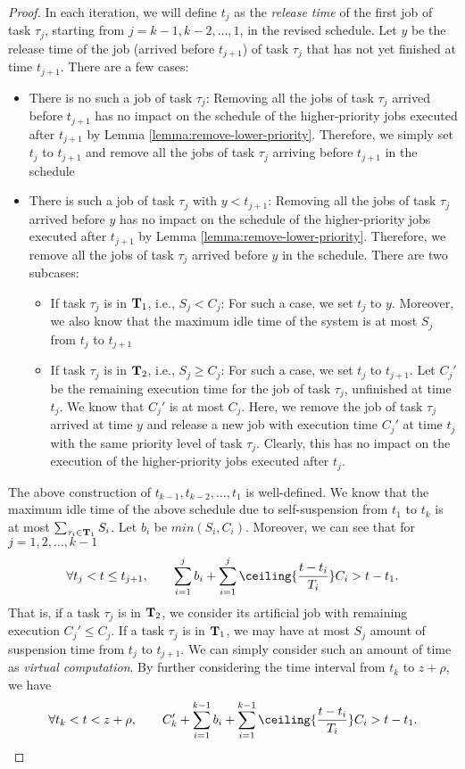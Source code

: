 \begin{proof}
In each iteration, we will define $t_j$ as the \emph{release time} of the first job of task $\tau_j$, starting from $j=k-1, k-2, \ldots, 1$, in the revised schedule. Let $y$ be the release time of the job (arrived before $t_{j+1}$) of task $\tau_j$ that has not yet finished at time $t_{j+1}$. There are a few cases:
\begin{itemize}
\item There is no such a job of task $\tau_j$: Removing all the jobs of task $\tau_j$ arrived before $t_{j+1}$ has no impact on the schedule of the higher-priority jobs executed after $t_{j+1}$ by Lemma \ref{lemma:remove-lower-priority}. Therefore, we simply set $t_j$ to $t_{j+1}$ and remove all the jobs of task $\tau_j$ arriving before $t_{j+1}$ in the schedule
\item There is such a job of task $\tau_j$ with $y < t_{j+1}$:  Removing all the jobs of task $\tau_j$ arrived before $y$ has no impact on the schedule of the higher-priority jobs executed after $t_{j+1}$ by Lemma \ref{lemma:remove-lower-priority}. Therefore, we remove all the jobs of task $\tau_j$ arrived before $y$ in the schedule. There are two subcases:
\begin{itemize}
\item If task $\tau_j$ is in ${\bf T}_1$, i.e., $S_j < C_j$: For such a case, we set $t_{j}$ to $y$. Moreover, we also know that the maximum idle time of the system is at most $S_j$ from $t_j$ to $t_{j+1}$
\item If task $\tau_j$ is in ${\bf T}_2$, i.e., $S_j \geq C_j$: For such a case, we set $t_{j}$ to $t_{j+1}$. Let $C_j'$ be the remaining execution time for the job of task $\tau_j$, unfinished at time $t_j$. We know that $C_j'$ is at most $C_j$. Here, we remove the job of task $\tau_j$ arrived at time $y$ and release a new job with execution time $C_j'$  at time $t_j$ with the same priority level of task $\tau_j$. Clearly, this has no impact on the execution of the higher-priority jobs executed after $t_j$.
\end{itemize}
\end{itemize}
 
The above construction of $t_{k-1}, t_{k-2}, \ldots, t_1$ is well-defined. We know that the maximum idle time of the above schedule due to self-suspension from $t_1$ to $t_k$ is at most $\sum_{\tau_i \in {\bf T}_1} S_i$. Let $b_i$ be $min(S_i, C_i)$. Moreover, we can see that for $j=1,2,\ldots,k-1$
\[
\forall t_j < t \leq t_{j+1},\qquad  \sum_{i=1}^{j} b_i + \sum_{i=1}^j \ceiling{\frac{t- t_i}{T_i} } C_i > t-t_1.
\]
That is, if a task $\tau_j$ is in ${\bf T}_2$, we consider its artificial job with remaining execution $C_j' \leq C_j$.  If a task $\tau_j$ is in ${\bf T}_1$, we may have at most $S_j$ amount of suspension time from $t_j$ to $t_{j+1}$. We can simply consider such an amount of time as \emph{virtual computation}. 
By further considering the time interval from $t_k$ to $z+\rho$, we have
\[
\forall t_k < t < z+\rho,\qquad  C_k'+\sum_{i=1}^{k-1} b_i + \sum_{i=1}^{k-1} \ceiling{\frac{t- t_i}{T_i} } C_i > t-t_1.
\]


\end{proof}
